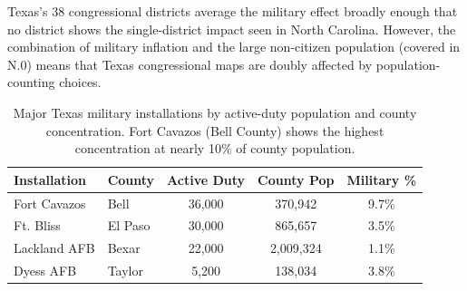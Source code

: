 Texas's 38 congressional districts average the military effect broadly enough that no district shows the single-district impact seen in North Carolina. However, the combination of military inflation and the large non-citizen population (covered in N.0) means that Texas congressional maps are doubly affected by population-counting choices.

\begin{table}[h]
\centering
\begin{tabular}{llccc}
\toprule
\textbf{Installation} & \textbf{County} & \textbf{Active Duty} & \textbf{County Pop} & \textbf{Military \%} \\
\midrule
Fort Cavazos & Bell & 36,000 & 370,942 & 9.7\% \\
Ft. Bliss & El Paso & 30,000 & 865,657 & 3.5\% \\
Lackland AFB & Bexar & 22,000 & 2,009,324 & 1.1\% \\
Dyess AFB & Taylor & 5,200 & 138,034 & 3.8\% \\
\bottomrule
\end{tabular}
\caption{Major Texas military installations by active-duty population and county concentration. Fort Cavazos (Bell County) shows the highest concentration at nearly 10\% of county population.}
\label{tab:texas-installations}
\end{table}
